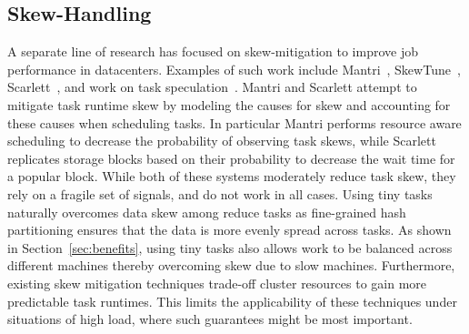 \subsection{Skew-Handling}
A separate line of research has focused on skew-mitigation to improve job
performance in datacenters. Examples of such work include
Mantri~\cite{ananthanarayanan2010reining}, SkewTune~\cite{kwon2012skewtune},
Scarlett~\cite{ananthanarayanan2011scarlett}, and work on task
speculation~\cite{zaharia2008improving}. Mantri and Scarlett attempt to
mitigate task runtime skew by modeling the causes for skew and accounting for
these causes when scheduling tasks. In particular Mantri performs resource aware scheduling to decrease the
probability of observing task skews, while Scarlett replicates storage blocks
based on their probability to decrease the wait time for a popular block. While
both of these systems moderately reduce task skew, they rely on a fragile set of
signals, and do not work in all cases. Using tiny tasks naturally overcomes data
skew among reduce tasks as fine-grained hash partitioning ensures that the data is
more evenly spread across tasks. As shown in 
Section~\ref{sec:benefits}, using tiny tasks also allows work to be balanced across
different machines thereby overcoming skew due to slow machines.
Furthermore, existing skew mitigation techniques trade-off cluster resources to
gain more predictable task runtimes. This limits the applicability of these
techniques under situations of high load, where such guarantees might be most
important.

